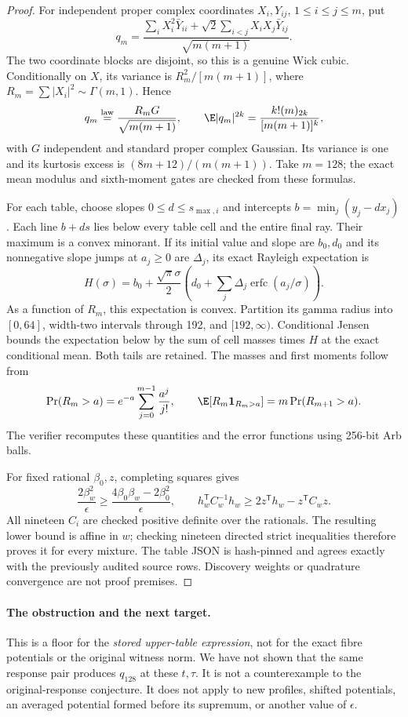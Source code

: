 \begin{proof}
For independent proper complex coordinates $X_i,Y_{ij}$, $1\le i\le j\le m$,
put
\[
 q_m=\frac{\sum_iX_i^2\bar Y_{ii}
       +\sqrt2\sum_{i<j}X_iX_j\bar Y_{ij}}{\sqrt{m(m+1)}}.
\]
The two coordinate blocks are disjoint, so this is a genuine Wick cubic.
Conditionally on $X$, its variance is $R_m^2/[m(m+1)]$,
where $R_m=\sum|X_i|^2\sim\Gamma(m,1)$. Hence
\[
 q_m\stackrel{\mathrm{law}}=\frac{R_mG}{\sqrt{m(m+1)}},\qquad
 \E|q_m|^{2k}=\frac{k!(m)_{2k}}{[m(m+1)]^k},
\]
with $G$ independent and standard proper complex Gaussian. Its variance is one
and its kurtosis excess is $(8m+12)/(m(m+1))$. Take $m=128$; the exact mean
modulus and sixth-moment gates are checked from these formulas.

For each table, choose slopes $0\le d\le s_{\max,i}$ and intercepts
$b=\min_j(y_j-dx_j)$. Each line $b+ds$ lies below every table cell and the
entire final ray. Their maximum is a convex minorant. If its initial value
and slope are $b_0,d_0$ and its nonnegative slope jumps at $a_j\ge0$ are
$\Delta_j$, its exact Rayleigh expectation is
\[
 H(\sigma)=b_0+\frac{\sqrt\pi\sigma}{2}
       \left(d_0+\sum_j\Delta_j\operatorname{erfc}(a_j/\sigma)\right).
\]
As a function of $R_m$, this expectation is convex. Partition its gamma
radius into $[0,64]$, width-two intervals through 192, and $[192,\infty)$.
Conditional Jensen bounds the expectation below by the sum of cell masses
times $H$ at the exact conditional mean. Both tails are retained. The masses
and first moments follow from
\[
 \Pr(R_m>a)=e^{-a}\sum_{j=0}^{m-1}\frac{a^j}{j!},\qquad
 \E[R_m\mathbf1_{R_m>a}]=m\Pr(R_{m+1}>a).
\]
The verifier recomputes these quantities and the error functions using
256-bit Arb balls.

For fixed rational $\beta_0,z$, completing squares gives
\[
 \frac{2\beta_w^2}{\epsilon}\ge
 \frac{4\beta_0\beta_w-2\beta_0^2}{\epsilon},\qquad
 h_w^{\mathsf T}C_w^{-1}h_w\ge
 2z^{\mathsf T}h_w-z^{\mathsf T}C_wz.
\]
All nineteen $C_i$ are checked positive definite over the rationals. The
resulting lower bound is affine in $w$; checking nineteen directed strict
inequalities therefore proves it for every mixture. The table JSON is
hash-pinned and agrees exactly with the previously audited source rows.
Discovery weights or quadrature convergence are not proof premises.
\end{proof}

\paragraph{The obstruction and the next target.}
This is a floor for the \emph{stored upper-table expression}, not for the
exact fibre potentials or the original witness norm. We have not shown that
the same response pair produces $q_{128}$ at these $t,\tau$. It is not a
counterexample to the original-response conjecture. It does not apply to new
profiles, shifted potentials, an averaged potential formed before its supremum,
or another value of $\epsilon$.

